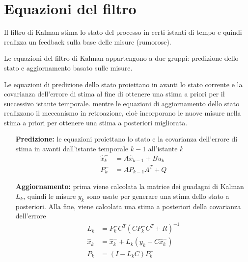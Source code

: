 \section{Equazioni del filtro}

Il filtro di Kalman stima lo stato del processo in certi istanti di tempo e quindi realizza un feedback sulla base delle misure (rumorose).

Le equazioni del filtro di Kalman appartengono a due gruppi:
predizione dello stato e aggiornamento basato sulle misure.

Le equazioni di predizione dello stato proiettano in avanti lo stato corrente e la covarianza dell’errore di stima al fine di ottenere una stima a priori per il successivo istante temporale.
mentre le equazioni di aggiornamento dello stato realizzano il meccanismo in retroazione, cioè incorporano le nuove misure nella stima a priori per ottenere una stima a posteriori migliorata.

\begin{itemize}
\item[\textbf{Predizione:}]le equazioni proiettano lo stato e la covarianza dell’errore di stima in avanti dall’istante temporale $k-1$ all’istante $k$ 
\begin{align*}
\hat{x}_k^- &= A\hat{x}_{k-1} + Bu_k \\
P_k^- &= AP_{k-1}A^T + Q
\end{align*}

\item[\textbf{Aggiornamento:}] prima viene calcolata la matrice dei guadagni di Kalman $L_k$, quindi le misure $y_k$ sono usate per generare una stima dello stato a posteriori. Alla fine, viene calcolata una stima a posteriori
della covarianza dell’errore
\begin{align*}
L_k &= P_k^-C^T(CP_k^-C^T + R)^{-1}\\
\hat{x}_k &= \hat{x}_k^- + L_k(y_k - C\hat{x}_k^-)\\
P_k &= (I - L_kC)P_k^-
\end{align*}


\end{itemize}